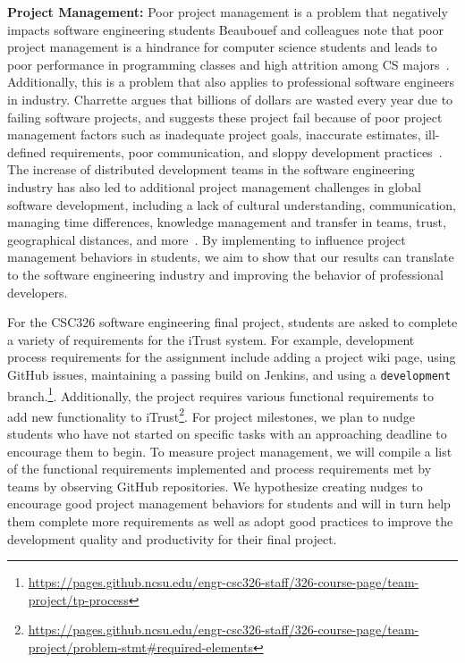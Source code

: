\textbf{Project Management:} Poor project management is a problem that negatively impacts software engineering students Beaubouef and colleagues note that poor project management is a hindrance for computer science students and leads to poor performance in programming classes and high attrition among CS majors~\cite{beaubouef2005high}. Additionally, this is a problem that also applies to professional software engineers in industry. Charrette argues that billions of dollars are wasted every year due to failing software projects, and suggests these project fail because of poor project management factors such as inadequate project goals, inaccurate estimates, ill-defined requirements, poor communication, and sloppy development practices~\cite{charette2005software}. The increase of distributed development teams in the software engineering industry has also led to additional project management challenges in global software development, including a lack of cultural understanding, communication, managing time differences, knowledge management and transfer in teams, trust, geographical distances, and more~\cite{niazi2016challenges}. By implementing \TOOL to influence project management behaviors in students, we aim to show that our results can translate to the software engineering industry and improving the behavior of professional developers.

For the CSC326 software engineering final project, students are asked to complete a variety of requirements for the iTrust system. For example, development process requirements for the assignment include adding a project wiki page, using GitHub issues, maintaining a passing build on Jenkins, and using a \texttt{development} branch.\footnote{\url{https://pages.github.ncsu.edu/engr-csc326-staff/326-course-page/team-project/tp-process}}. Additionally, the project requires various functional requirements to add new functionality to iTrust\footnote{\url{https://pages.github.ncsu.edu/engr-csc326-staff/326-course-page/team-project/problem-stmt\#required-elements}}. For project milestones, we plan to nudge students who have not started on specific tasks with an approaching deadline to encourage them to begin. To measure project management, we will compile a list of the functional requirements implemented and process requirements met by teams by observing GitHub repositories. We hypothesize creating nudges to encourage good project management behaviors for students and will in turn help them complete more requirements as well as adopt good practices to improve the development quality and productivity for their final project.

